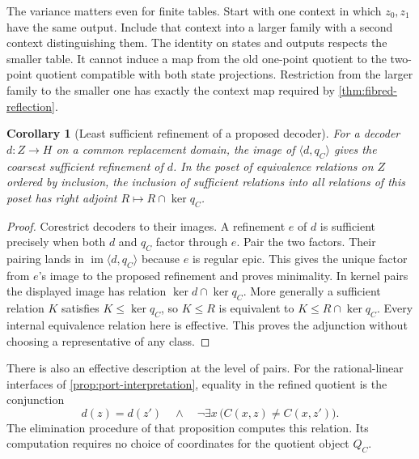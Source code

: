 \documentclass[11pt,a4paper]{article}
\newtheorem{corollary}[corollary]{Corollary}
\theoremstyle{definition}
\theoremstyle{remark}\newaliascnt{remark}{theorem}
\numberwithin{equation}{section}
\begin{document}
The variance matters even for finite tables. Start with one context in which \(z_0,z_1\) have the same output. Include that context into a larger family with a second context distinguishing them. The identity on states and outputs respects the smaller table. It cannot induce a map from the old one-point quotient to the two-point quotient compatible with both state projections. Restriction from the larger family to the smaller one has exactly the context map required by \cref{thm:fibred-reflection}.

\begin{corollary}[Least sufficient refinement of a proposed decoder]\label{cor:repair-decoder}
For a decoder \(d:Z\to H\) on a common replacement domain, the image of \(\langle d,q_C\rangle\) gives the coarsest sufficient refinement of \(d\). In the poset of equivalence relations on \(Z\) ordered by inclusion, the inclusion of sufficient relations into all relations of this poset has right adjoint \(R\mapsto R\cap\ker q_C\).
\end{corollary}
\begin{proof}
Corestrict decoders to their images. A refinement \(e\) of \(d\) is sufficient precisely when both \(d\) and \(q_C\) factor through \(e\). Pair the two factors. Their pairing lands in \(\operatorname{im}\langle d,q_C\rangle\) because \(e\) is regular epic. This gives the unique factor from \(e\)'s image to the proposed refinement and proves minimality. In kernel pairs the displayed image has relation \(\ker d\cap\ker q_C\). More generally a sufficient relation \(K\) satisfies \(K\le\ker q_C\), so \(K\le R\) is equivalent to \(K\le R\cap\ker q_C\). Every internal equivalence relation here is effective. This proves the adjunction without choosing a representative of any class.
\end{proof}

There is also an effective description at the level of pairs. For the rational-linear interfaces of \cref{prop:port-interpretation}, equality in the refined quotient is the conjunction
\[
 d(z)=d(z')\quad\wedge\quad
 \neg\exists x\,\bigl(C(x,z)\ne C(x,z')\bigr).
\]
The elimination procedure of that proposition computes this relation. Its computation requires no choice of coordinates for the quotient object \(Q_C\).
\end{document}
